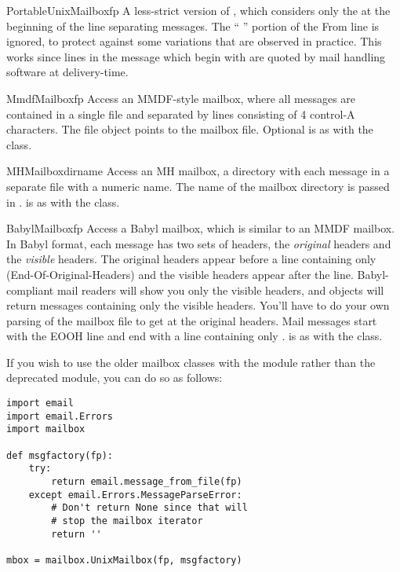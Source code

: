 \begin{classdesc}{PortableUnixMailbox}{fp}
A less-strict version of , which considers only the
 at the beginning of the line separating messages.  The
`` '' portion of the From line is ignored, to
protect against some variations that are observed in practice.  This
works since lines in the message which begin with  are
quoted by mail handling software at delivery-time.
\end{classdesc}

\begin{classdesc}{MmdfMailbox}{fp}
Access an MMDF-style mailbox, where all messages are contained
in a single file and separated by lines consisting of 4 control-A
characters.  The file object  points to the mailbox file.
Optional  is as with the  class.
\end{classdesc}

\begin{classdesc}{MHMailbox}{dirname}
Access an MH mailbox, a directory with each message in a separate
file with a numeric name.
The name of the mailbox directory is passed in .
 is as with the  class.
\end{classdesc}

\begin{classdesc}{BabylMailbox}{fp}
Access a Babyl mailbox, which is similar to an MMDF mailbox.  In
Babyl format, each message has two sets of headers, the
\emph{original} headers and the \emph{visible} headers.  The original
headers appear before a line containing only 
(End-Of-Original-Headers) and the visible headers appear after the
 line.  Babyl-compliant mail readers will show you only the
visible headers, and  objects will return messages
containing only the visible headers.  You'll have to do your own
parsing of the mailbox file to get at the original headers.  Mail
messages start with the EOOH line and end with a line containing only
.   is as with the
 class.
\end{classdesc}

If you wish to use the older mailbox classes with the  module
rather than the deprecated  module, you can do so as follows:

\begin{verbatim}
import email
import email.Errors
import mailbox

def msgfactory(fp):
    try:
        return email.message_from_file(fp)
    except email.Errors.MessageParseError:
        # Don't return None since that will
        # stop the mailbox iterator
        return ''

mbox = mailbox.UnixMailbox(fp, msgfactory)
\end{verbatim}

